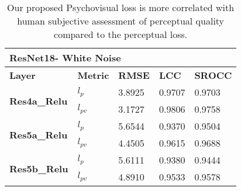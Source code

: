 \documentclass[10pt,twocolumn,letterpaper]{article}
\begin{document}
\begin{table}[]
\caption{Our proposed Psychovisual loss is more correlated with human subjective assessment of perceptual quality compared to the perceptual loss.}
\begin{tabular}{|l|l|l|l|l|}
\hline
\multicolumn{5}{|l|}{\textbf{ResNet18- White Noise}}                                                    \\ \hline
\textbf{Layer}                        & \textbf{Metric} & \textbf{RMSE} & \textbf{LCC} & \textbf{SROCC} \\ \hline
\multirow{2}{*}{\textbf{Res4a\_Relu}} & \textbf{$l_{p}$}              & 3.8925        & 0.9707       & 0.9703         \\ \cline{2-5}
                                      & \textbf{$l_{pv}$}             & 3.1727        & 0.9806       & 0.9758         \\ \hline
\multirow{2}{*}{\textbf{Res5a\_Relu}} & \textbf{$l_{p}$}              & 5.6544        & 0.9370       & 0.9504         \\ \cline{2-5}
                                      & \textbf{$l_{pv}$}             & 4.4505        & 0.9615       & 0.9688         \\ \hline
\multirow{2}{*}{\textbf{Res5b\_Relu}} & \textbf{$l_{p}$}              & 5.6111        & 0.9380       & 0.9444         \\ \cline{2-5}
                                      & \textbf{$l_{pv}$}             & 4.8910        & 0.9533       & 0.9578         \\ \hline
\end{tabular}
\end{table}
\end{document}
